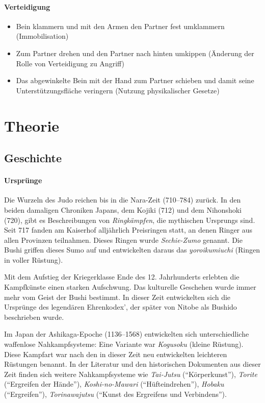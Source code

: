 \documentclass[justified, a4paper, notitlepage, captions=tableheading, nobib]{tufte-handout}
\begin{document}
\paragraph{Verteidigung}
\label{sec:orgaa27e71}
\begin{itemize}
\item Bein klammern und mit den Armen den Partner fest umklammern (Immobilisation)
\item Zum Partner drehen und den Partner nach hinten umkippen (Änderung der Rolle von Verteidigung zu Angriff)
\item Das abgewinkelte Bein mit der Hand zum Partner schieben und damit seine Unterstützungsfläche veringern (Nutzung physikalischer Gesetze)
\end{itemize}

\newpage
\section{Theorie }
\label{sec:org5996d73}
\subsection{Geschichte}
\label{sec:org3feeba9}
\paragraph{Ursprünge}
\label{sec:org99ed289}
Die Wurzeln des \label{org4f88021}Judo reichen bis in die Nara-Zeit (710–784) zurück. In den beiden damaligen Chroniken Japans, dem Kojiki (712) und dem Nihonshoki (720), gibt es Beschreibungen von \emph{Ringkämpfen}, die mythischen Ursprungs sind. Seit 717 fanden am Kaiserhof alljährlich Preisringen statt, an denen Ringer aus allen Provinzen teilnahmen. Dieses Ringen wurde \emph{Sechie-Zumo} genannt. Die Bushi griffen dieses Sumo auf und entwickelten daraus das \emph{yoroikumiuchi} (Ringen in voller Rüstung).

Mit dem Aufstieg der Kriegerklasse Ende des 12. Jahrhunderts erlebten die Kampfkünste einen starken Aufschwung. Das kulturelle Geschehen wurde immer mehr vom Geist der Bushi bestimmt. In dieser Zeit entwickelten sich die Ursprünge des legendären Ehrenkodex', der später von Nitobe als Bushido beschrieben wurde.

Im Japan der Ashikaga-Epoche (1136–1568) entwickelten sich unterschiedliche waffenlose Nahkampfsysteme: Eine Variante war \emph{Kogusoku} (kleine Rüstung). Diese Kampfart war nach den in dieser Zeit neu entwickelten leichteren Rüstungen benannt. In der Literatur und den historischen Dokumenten aus dieser Zeit finden sich weitere Nahkampfsysteme wie \emph{Tai-Jutsu} ("`Körperkunst"'), \emph{Torite} ("`Ergreifen der Hände"'), \emph{Koshi-no-Mawari} ("`Hüfteindrehen"'), \emph{Hobaku} ("`Ergreifen"'), \emph{Torinawajutsu} ("`Kunst des Ergreifens und Verbindens"').
\end{document}

